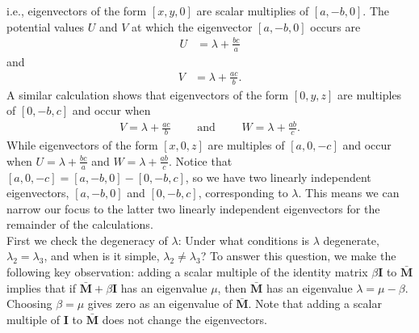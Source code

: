 \documentclass[preprint,12pt]{elsarticle}
\newcommand{\M}{\mathbf{M}}
\begin{document}
i.e., eigenvectors of the form $[x,y,0]$ are scalar multiplies of $[a,-b,0]$. 
The potential values $U$ and $V$ at which the eigenvector $[a,-b,0]$ occurs are
\begin{align}\label{potential_U}
    U&=\lambda+\frac{bc}{a}
\end{align}
and
\begin{align}\label{potential_V}
    V&=\lambda+\frac{ac}{b}.
\end{align}
A similar calculation shows that eigenvectors of the form $[0,y,z]$ are multiples of $[0,-b,c]$ and occur when 
\begin{align}\label{potential_W}
V=\lambda+\frac{ac}{b} \qquad\mbox{ and }\qquad W=\lambda+\frac{ab}{c}.
\end{align}
While eigenvectors of the form $[x,0,z]$ are multiples of $[a,0,-c]$ and occur when $U=\lambda+\frac{bc}{a}$ and $W=\lambda+\frac{ab}{c}$. Notice that $[a,0,-c]=[a,-b,0]-[0,-b,c]$, so we have two linearly independent eigenvectors, $[a,-b,0]$ and $[0,-b,c]$, corresponding to $\lambda$. This means we can narrow our focus to the latter two linearly independent eigenvectors for the remainder of the calculations.\\

First we check the degeneracy of $\lambda$: Under what conditions is $\lambda$ degenerate, $\lambda_2=\lambda_3$, and when is it simple, $\lambda_2\neq \lambda_3$? To answer this question, we make the following key observation: adding a scalar multiple of the identity matrix $\beta \mathbf{I}$ to $\bar{\M}$ implies that if $\bar{\M}+\beta \mathbf{I}$ has an eigenvalue $\mu$, then $\bar{\M}$ has an eigenvalue $\lambda=\mu-\beta$. Choosing $\beta=\mu$ gives zero as an eigenvalue of $\bar{\M}$. Note that adding a scalar multiple of $\mathbf{I}$ to $\bar{\M}$ does not change the eigenvectors.
\end{document}
